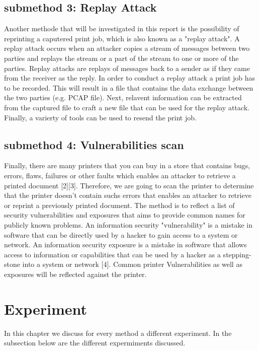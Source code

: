 \documentclass[a4paper]{article}
\begin{document}
\subsection{submethod 3:  Replay Attack}
Another methode that will be investigated in this report is the
possibility of reprinting a caputered print job, which is also known as a
"replay attack". A replay attack occurs when an attacker copies a stream of messages between two parties and replays the stream or a part of the stream to one or more of the parties. Replay attacks are replays of messages back to a sender as if they came from the receiver as the reply. In order to conduct a replay attack a print job has to be recorded. This will result in a file that contains the data exchange between the two parties (e.g. PCAP file). Next, relavent information can be extracted from the captured file to craft a new file that can be used for the replay attack. Finally, a varierty of tools can be used to resend the print job.

\subsection{submethod 4:  Vulnerabilities scan}
Finally, there are many printers that you can buy in a store that contains
bugs, errors, flaws, failures or other faults which enables an attacker to
retrieve a printed document [2][3]. Therefore, we are going to scan the
printer to determine that the printer doesn't contain suchs errors that enables an attacker to retrieve or reprint a previously printed document. The method is to reflect a list of security vulnerabilities and exposures that aims to provide common names for publicly known problems. An information security "vulnerability" is a mistake in software that can be directly used by a hacker to gain access to a system or network. An information security exposure is a mistake in software that allows access to information or capabilities that can be used by a hacker as a stepping-stone into a system or network [4]. Common printer
Vulnerabilities as well as exposures will be reflected against the printer.


\section{Experiment} 
In this chapter we discuss for every method a different experiment. In the subsection below are the different expermiments discussed.
\end{document}
